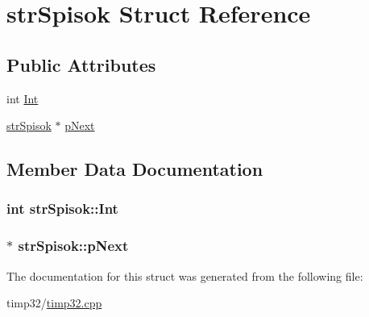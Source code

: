 \hypertarget{structstr_spisok}{\section{str\-Spisok \-Struct \-Reference}
\label{structstr_spisok}
}
\subsection*{\-Public \-Attributes}
\begin{DoxyCompactItemize}
\item 
int \hyperlink{structstr_spisok_aff1046e16eabdc2225f1fd912a13d211}{\-Int}
\item 
\hyperlink{structstr_spisok}{str\-Spisok} $\ast$ \hyperlink{structstr_spisok_a044eed19d783630630f3b12a1be5d472}{p\-Next}
\end{DoxyCompactItemize}


\subsection{\-Member \-Data \-Documentation}
\hypertarget{structstr_spisok_aff1046e16eabdc2225f1fd912a13d211}{
\subsubsection[{\-Int}]{\setlength{\rightskip}{0pt plus 5cm}int {\bf str\-Spisok\-::\-Int}}}\label{structstr_spisok_aff1046e16eabdc2225f1fd912a13d211}
\hypertarget{structstr_spisok_a044eed19d783630630f3b12a1be5d472}{
\subsubsection[{p\-Next}]{$\ast$ {\bf str\-Spisok\-::p\-Next}}}\label{structstr_spisok_a044eed19d783630630f3b12a1be5d472}


\-The documentation for this struct was generated from the following file\-:\begin{DoxyCompactItemize}
\item 
timp32/\hyperlink{timp32_8cpp}{timp32.\-cpp}\end{DoxyCompactItemize}
